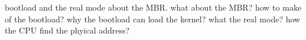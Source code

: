 bootload and the real mode
about the MBR.
what about the MBR?
how to make of the bootload?
why the bootload can load the kernel?
what the real mode?
how the CPU find the phyical address?


